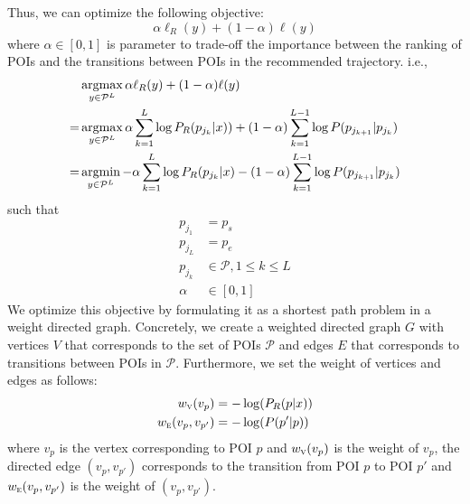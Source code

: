 Thus, we can optimize the following objective:
\begin{displaymath}
    \alpha \ell_R(y) + (1-\alpha) \ell(y)
\end{displaymath}
where $\alpha \in [0, 1]$ is parameter to trade-off the importance between the ranking of POIs
and the transitions between POIs in the recommended trajectory.
i.e.,
\begin{align*}
    & \operatorname*{argmax}_{y \in \mathcal{P}^L} \alpha \ell_R(y) + (1-\alpha) \ell(y) \\
   =& \operatorname*{argmax}_{y \in \mathcal{P}^L} \alpha \sum_{k=1}^L \log P_R(p_{j_k} | x)) + 
      (1-\alpha) \sum_{k=1}^{L-1} \log P(p_{j_{k+1}} | p_{j_k}) \\
   =& \operatorname*{argmin}_{y \in \mathcal{P}^L} - \alpha \sum_{k=1}^L \log P_R(p_{j_k} | x) -
      (1-\alpha) \sum_{k=1}^{L-1} \log P(p_{j_{k+1}} | p_{j_k}) 
\end{align*}
such that
\begin{align*}
    p_{j_1} &= p_s \\
    p_{j_L} &= p_e \\
    p_{j_k} &\in \mathcal{P}, 1 \le k \le L \\
    \alpha  &\in [0, 1]
\end{align*}
We optimize this objective by formulating it as a shortest path problem in a weight directed graph.
Concretely, 
we create a weighted directed graph $G$ with vertices $V$ that corresponds to the set of POIs $\mathcal{P}$ and 
edges $E$ that corresponds to transitions between POIs in $\mathcal{P}$.
Furthermore, we set the weight of vertices and edges as follows:
\begin{align*}
    w_{\textsc{v}}(v_{p})       & = -\log(P_R(p | x)) \\
    w_{\textsc{e}}(v_p, v_{p'}) & = -\log(P(p' | p))
\end{align*}
where $v_{p}$ is the vertex corresponding to POI $p$ and $w_{\textsc{v}}(v_{p})$ is the weight of $v_{p}$,
the directed edge $(v_p, v_{p'})$ corresponds to the transition from POI $p$ to POI $p'$ and 
$w_{\textsc{e}}(v_p, v_{p'})$ is the weight of $(v_p, v_{p'})$.

